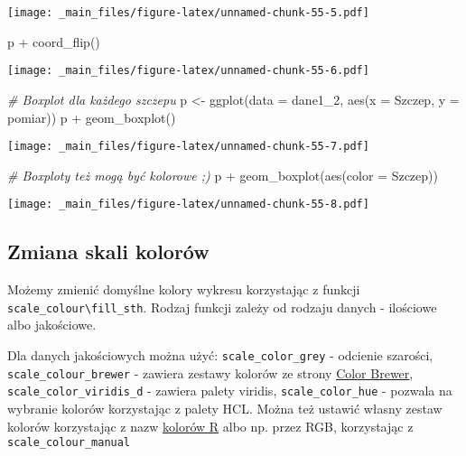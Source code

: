 \documentclass[
]{book}
\newenvironment{Shaded}{\begin{snugshade}}{\end{snugshade}}
\newcommand{\AttributeTok}[1]{\textcolor[rgb]{0.77,0.63,0.00}{#1}}
\newcommand{\CommentTok}[1]{\textcolor[rgb]{0.56,0.35,0.01}{\textit{#1}}}
\newcommand{\FunctionTok}[1]{\textcolor[rgb]{0.00,0.00,0.00}{#1}}
\newcommand{\NormalTok}[1]{#1}
\newcommand{\OtherTok}[1]{\textcolor[rgb]{0.56,0.35,0.01}{#1}}
\newcommand{\SpecialCharTok}[1]{\textcolor[rgb]{0.00,0.00,0.00}{#1}}
\begin{document}
\texttt{[image: \_main\_files/figure-latex/unnamed-chunk-55-5.pdf]}

\begin{Shaded}
\begin{Highlighting}[]
\NormalTok{p }\SpecialCharTok{+} \FunctionTok{coord\_flip}\NormalTok{()}
\end{Highlighting}
\end{Shaded}

\texttt{[image: \_main\_files/figure-latex/unnamed-chunk-55-6.pdf]}

\begin{Shaded}
\begin{Highlighting}[]
\CommentTok{\# Boxplot dla każdego szczepu}
\NormalTok{p }\OtherTok{\textless{}{-}} \FunctionTok{ggplot}\NormalTok{(}\AttributeTok{data =}\NormalTok{ dane1\_2, }\FunctionTok{aes}\NormalTok{(}\AttributeTok{x =}\NormalTok{ Szczep, }\AttributeTok{y =}\NormalTok{ pomiar))}
\NormalTok{p }\SpecialCharTok{+} \FunctionTok{geom\_boxplot}\NormalTok{()}
\end{Highlighting}
\end{Shaded}

\texttt{[image: \_main\_files/figure-latex/unnamed-chunk-55-7.pdf]}

\begin{Shaded}
\begin{Highlighting}[]
\CommentTok{\# Boxploty też mogą być kolorowe ;)}
\NormalTok{p }\SpecialCharTok{+} \FunctionTok{geom\_boxplot}\NormalTok{(}\FunctionTok{aes}\NormalTok{(}\AttributeTok{color =}\NormalTok{ Szczep))}
\end{Highlighting}
\end{Shaded}

\texttt{[image: \_main\_files/figure-latex/unnamed-chunk-55-8.pdf]}

\hypertarget{zmiana-skali-koloruxf3w}{%
\subsection{Zmiana skali kolorów}\label{zmiana-skali-koloruxf3w}}

Możemy zmienić domyślne kolory wykresu korzystając z funkcji \texttt{scale\_colour\textbackslash{}fill\_sth}. Rodzaj funkcji zależy od rodzaju danych - ilościowe albo jakościowe.

Dla danych jakościowych można użyć: \texttt{scale\_color\_grey} - odcienie szarości, \texttt{scale\_colour\_brewer} - zawiera zestawy kolorów ze strony \href{http://colorbrewer2.org/}{Color Brewer}, \texttt{scale\_color\_viridis\_d} - zawiera palety viridis, \texttt{scale\_color\_hue} - pozwala na wybranie kolorów korzystając z palety HCL. Można też ustawić własny zestaw kolorów korzystając z nazw \href{http://www.stat.columbia.edu/~tzheng/files/Rcolor.pdf}{kolorów R} albo np. przez RGB, korzystając z \texttt{scale\_colour\_manual}
\end{document}
